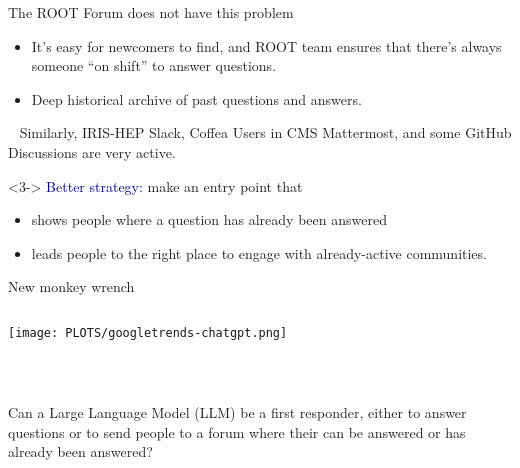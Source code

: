 \documentclass[aspectratio=169]{beamer}
\begin{document}
\begin{frame}{The ROOT Forum does not have this problem}
\large
\vspace{0.25 cm}

\begin{center}
\end{center}

\begin{itemize}
\item<2-> It's easy for newcomers to find, and ROOT team ensures that there's always someone ``on shift'' to answer questions.
\item<3-> Deep historical archive of past questions and answers.
\end{itemize}
\end{frame}

\begin{frame}{\mbox{ }}
\large
\vspace{0.5 cm}
Similarly, IRIS-HEP Slack, Coffea Users in CMS Mattermost, and some GitHub Discussions are very active.

\vspace{1 cm}

\vspace{1 cm}
\begin{uncoverenv}<3->
\textcolor{darkblue}{Better strategy:} make an entry point that

\vspace{0.25 cm}
\begin{itemize}
\item shows people where a question has already been answered
\item leads people to the right place to engage with already-active communities.
\end{itemize}
\end{uncoverenv}
\end{frame}

\begin{frame}{New monkey wrench}
\vspace{0.17 cm}
\begin{columns}
\texttt{[image: PLOTS/googletrends-chatgpt.png]}
\end{columns}
\end{frame}

\begin{frame}{\mbox{ }}
\Large
\vspace{1 cm}

Can a Large Language Model (LLM) be a first responder, either to answer questions or to send people to a forum where their can be answered or has already been answered?

\vspace{0.5 cm}
\begin{center}
\end{center}
\end{frame}
\end{document}
